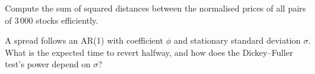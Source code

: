 \begin{interviewq}\label{iq:s1:pairs-and-baskets:5}
Compute the sum of squared distances between the normalised prices of all pairs of 3\,000 stocks efficiently.
\end{interviewq}

\begin{interviewq}\label{iq:s1:pairs-and-baskets:6}
A spread follows an AR(1) with coefficient $\phi$ and stationary standard deviation $\sigma$. What is the expected time to revert halfway, and how does the
Dickey--Fuller test's power depend on $\sigma$?
\end{interviewq}
